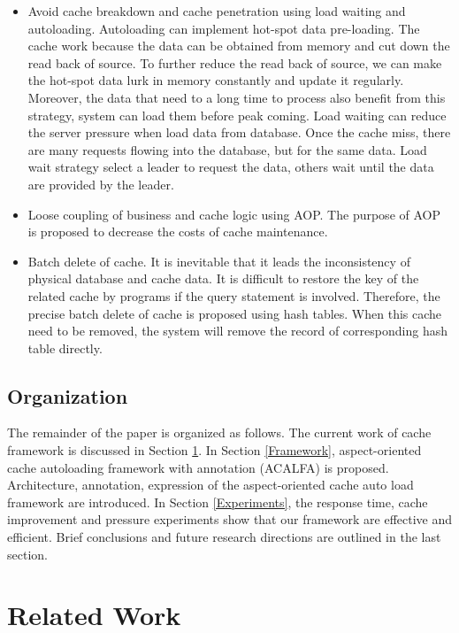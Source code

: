 \documentclass{singlecol-new}
\theoremstyle{TH}{
\newtheorem{lemma}{Lemma}
\newtheorem{theorem}[lemma]{Theorem}
\newtheorem{corrolary}[lemma]{Corrolary}
\newtheorem{conjecture}[lemma]{Conjecture}
\newtheorem{proposition}[lemma]{Proposition}
\newtheorem{claim}[lemma]{Claim}
\newtheorem{stheorem}[lemma]{Wrong Theorem}
}
\theoremstyle{THrm}{
\newtheorem{definition}{Definition}[section]
\newtheorem{question}{Question}[section]
\newtheorem{remark}{Remark}
\newtheorem{scheme}{Scheme}
}
\theoremstyle{THhit}{
\newtheorem{case}{Case}[section]
}
\begin{document}
\begin{itemize}
  \item Avoid cache breakdown and cache penetration using load waiting and autoloading. Autoloading can implement hot-spot data pre-loading. The cache work because the data can be obtained from memory and cut down the read back of source. To further reduce the read back of source, we can make the hot-spot data lurk in memory constantly and update it regularly. Moreover, the data that need to a long time to process also benefit from this strategy, system can load them before peak coming. Load waiting can reduce the server pressure when load data from database. Once the cache miss, there are many requests flowing into the database, but for the same data. Load wait strategy select a leader to request the data, others wait until the data are provided by the leader.
  \item Loose coupling of business and cache logic using AOP. The purpose of AOP is proposed to decrease the costs of cache maintenance.
  \item Batch delete of cache. It is inevitable that it leads the inconsistency of physical database and cache data. It is difficult to restore the key of the related cache by programs if the query statement is involved. Therefore, the precise batch delete of cache is proposed using hash tables. When this cache need to be removed, the system will remove the record of corresponding hash table directly.
\end{itemize}

\subsection{Organization}
The remainder of the paper is organized as follows. The current work of cache framework is discussed in Section \ref{RelatedWork}. In Section \ref{Framework}, aspect-oriented cache autoloading framework with annotation (ACALFA) is proposed. Architecture, annotation, expression of the aspect-oriented cache auto load framework are introduced. In Section \ref{Experiments}, the response time, cache improvement and pressure experiments show that our framework are effective and efficient. Brief conclusions and future research directions are outlined in the last section.


\section{Related Work}
\label{RelatedWork}
\end{document}
